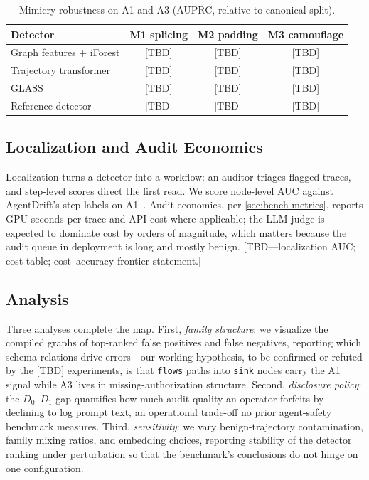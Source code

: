\begin{table}[tb]
  \centering
  \caption{Mimicry robustness on A1 and A3 (AUPRC, relative to canonical split).}
  \label{tab:mimicry}
  \begin{small}
  \begin{tabular}{lccc}
    \toprule
    \textbf{Detector} & \textbf{M1 splicing} & \textbf{M2 padding} & \textbf{M3 camouflage} \\
    \midrule
    Graph features + iForest & [TBD] & [TBD] & [TBD] \\
    Trajectory transformer & [TBD] & [TBD] & [TBD] \\
    GLASS & [TBD] & [TBD] & [TBD] \\
    Reference detector & [TBD] & [TBD] & [TBD] \\
    \bottomrule
  \end{tabular}
  \end{small}
\end{table}

\subsection{Localization and Audit Economics}
\label{sec:results-cost}

Localization turns a detector into a workflow: an auditor triages flagged traces, and step-level scores direct the first read. We score node-level AUC against AgentDrift's step labels on A1~\cite{pinjari2026agentdrift}. Audit economics, per \cref{sec:bench-metrics}, reports GPU-seconds per trace and API cost where applicable; the LLM judge is expected to dominate cost by orders of magnitude, which matters because the audit queue in deployment is long and mostly benign. [TBD---localization AUC; cost table; cost--accuracy frontier statement.]

\subsection{Analysis}
\label{sec:results-analysis}

Three analyses complete the map. First, \emph{family structure}: we visualize the compiled graphs of top-ranked false positives and false negatives, reporting which schema relations drive errors---our working hypothesis, to be confirmed or refuted by the [TBD] experiments, is that \texttt{flows} paths into \texttt{sink} nodes carry the A1 signal while A3 lives in missing-authorization structure. Second, \emph{disclosure policy}: the $D_0$--$D_1$ gap quantifies how much audit quality an operator forfeits by declining to log prompt text, an operational trade-off no prior agent-safety benchmark measures. Third, \emph{sensitivity}: we vary benign-trajectory contamination, family mixing ratios, and embedding choices, reporting stability of the detector ranking under perturbation so that the benchmark's conclusions do not hinge on one configuration.
